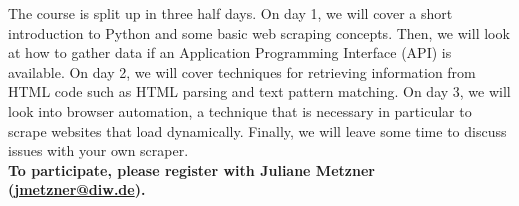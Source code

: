 \documentclass[a4paper]{article}
\begin{document}
The course is split up in three half days. On day 1, we will cover a short introduction to Python and some basic web scraping concepts. Then, we will look at how to gather data if an Application Programming Interface (API) is available. On day 2, we will cover techniques for retrieving information from HTML code such as HTML parsing and text pattern matching. On day 3, we will look into browser automation, a technique that is necessary in particular to scrape websites that load dynamically. Finally, we will leave some time to discuss issues with your own scraper. \\

\noindent\textbf{To participate, please register with Juliane Metzner (\href{mailto:jmetzner@diw.de}{jmetzner@diw.de}).}







\end{document}
